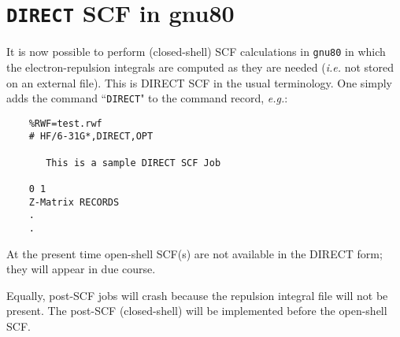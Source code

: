 
\section*{{\tt DIRECT} SCF in gnu80}
It is now possible to perform (closed-shell) SCF calculations
in {\tt gnu80} in which the electron-repulsion integrals are
computed as they are needed ({\em i.e.} not stored on an external file).
This is DIRECT SCF in the usual terminology. One simply adds the command 
``{\tt DIRECT}" to the command record, {\em e.g.}:
\begin{verbatim}
    %RWF=test.rwf
    # HF/6-31G*,DIRECT,OPT

       This is a sample DIRECT SCF Job

    0 1
    Z-Matrix RECORDS
    .
    .

\end{verbatim}
At the present time open-shell SCF(s) are not available in the DIRECT
form; they will appear in due course.

Equally, post-SCF jobs will crash because the repulsion integral file
will not be present.
The post-SCF (closed-shell) will be implemented before the open-shell
SCF.


